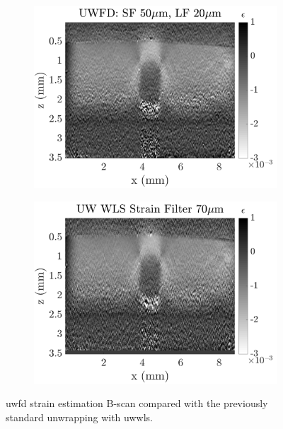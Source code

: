 \begin{figure}
	\centering
	\begin{subfigure}{0.49\textwidth}
		\centering
		\includegraphics[width=\textwidth]{figures/uwfd_compare.png}
	\end{subfigure}
	\begin{subfigure}{0.49\textwidth}
		\centering
		\includegraphics[width=\textwidth]{figures/wls_compare.png}
	\end{subfigure}
	\caption{\ac{uwfd} strain estimation B-scan compared with the previously standard unwrapping with \ac{uwwls}.}
	\label{wls_uwfd_compare}
\end{figure}

